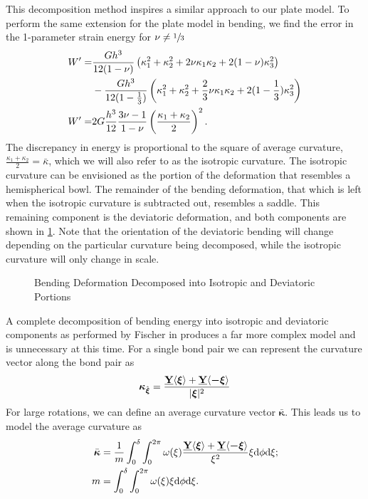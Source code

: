 This decomposition method inspires a similar approach to our plate model. To perform the same extension for the plate model in bending, we find the error in the 1-parameter strain energy for \(\nu \neq \sfrac{1}{3}\)
%
\begin{align}
    W'=&\frac{G h^3}{12(1-\nu)} \left(\kappa_1^2+\kappa_2^2+2\nu\kappa_1\kappa_2+2(1-\nu)\kappa_3^2 \right)\notag\\
    &-\frac{G h^3}{12(1-\frac{1}{3})} \left(\kappa_1^2+\kappa_2^2+\frac{2}{3}\nu\kappa_1\kappa_2+2(1-\frac{1}{3})\kappa_3^2 \right) \notag \\
    W'=&2G \frac{h^3}{12}\frac{3\nu-1}{1-\nu} \left(\frac{\kappa_1+\kappa_2}{2}\right)^2.\notag
\end{align}
%
The discrepancy in energy is proportional to the square of average curvature, \(\frac{\kappa_1+\kappa_2}{2} = \bar{\kappa}\), which we will also refer to as the isotropic curvature.  The isotropic curvature can be envisioned as the portion of the deformation that resembles a hemispherical bowl.  The remainder of the bending deformation, that which is left when the isotropic curvature is subtracted out, resembles a saddle. This remaining component is the deviatoric deformation, and both components are shown in \cref{fig:BendingDecomp}. Note that the orientation of the deviatoric bending will change depending on the particular curvature being decomposed, while the isotropic curvature will only change in scale.
%
\begin{figure}[h]
  \centering
  \resizebox{\linewidth}{!}{}
  \caption{Bending Deformation Decomposed into Isotropic and Deviatoric Portions}
  \label{fig:BendingDecomp}
\end{figure}
%
A complete decomposition of bending energy into isotropic and deviatoric components as performed by Fischer in \cite{fischer1992bending} produces a far more complex model and is unnecessary at this time.  For a single bond pair we can represent the curvature vector along the bond pair as 
%
\begin{equation}
    \boldsymbol{\kappa} _{\hat{\boldsymbol{\xi}}} = \frac{\vstate{Y}{}{\boldsymbol{\xi}}+\vstate{Y}{}{\boldsymbol{-\xi}}}{|\boldsymbol{\xi}|^2}\notag
\end{equation}
%
For large rotations, we can define an average curvature vector \(\bar{\boldsymbol{\kappa}}\).
This leads us to model the average curvature as 
%
\begin{align}
    \bar{\boldsymbol{\kappa}} &= \frac{1}{m} \int_0^\delta \int_0^{2\pi}\omega(\xi)\frac{\vstate{Y}{}{\boldsymbol{\xi}}+\vstate{Y}{}{\boldsymbol{-\xi}}}{\xi^2} \xi {\rm d}\phi {\rm d}\xi ;\notag \\
    m &= \int_0^\delta \int_0^{2\pi}\omega(\xi)\xi {\rm d}\phi {\rm d}\xi. \notag
\end{align}
